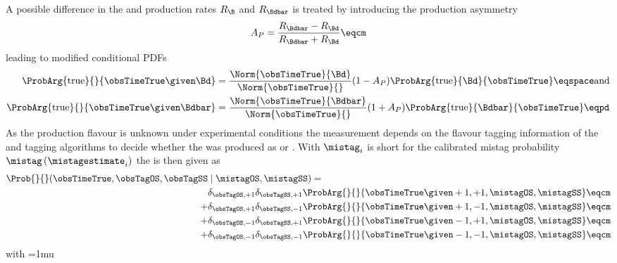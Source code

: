 %
A possible difference in the \Bd and \Bdbar production rates $R_{\B}$ and
$R_{\Bdbar}$ is treated by introducing the production asymmetry
%
\begin{equation}\label{eq:measurement_of_sin2beta:likelihood_fit:model:decay_time:production_asymmetry}
  A_P = \frac{R_{\Bdbar} - R_{\Bd}}{R_{\Bdbar} + R_{\Bd}}\eqcm
\end{equation}
%
leading to modified conditional \acp{PDF}
%
\begin{equation}\label{eq:measurement_of_sin2beta:likelihood_fit:model:decay_time:true_pdf}
  \begin{split}
    \ProbArg{\text{true}}{}{\obsTimeTrue\given\Bd}    &= \frac{\Norm{\obsTimeTrue}{\Bd}}{\Norm{\obsTimeTrue}{}}    (1 - A_P) \ProbArg{\text{true}}{\Bd}{\obsTimeTrue}     \eqspace \text{and} \\
    \ProbArg{\text{true}}{}{\obsTimeTrue\given\Bdbar} &= \frac{\Norm{\obsTimeTrue}{\Bdbar}}{\Norm{\obsTimeTrue}{}} (1 + A_P) \ProbArg{\text{true}}{\Bdbar}{\obsTimeTrue}  \eqpd
  \end{split}
\end{equation}
%
As the production flavour is unknown under experimental conditions the
measurement depends on the flavour tagging information of the \OS and \SSpi
tagging algorithms to decide whether the \Bmeson was produced as \Bd or \Bdbar.
With $\mistag_{i}$ is short for the calibrated mistag probability
$\mistag\left(\mistagestimate_{i}\right)$ the \PDF is then given as
%
\begin{equation}\label{eq:measurement_of_sin2beta:likelihood_fit:model:decay_time:measured_pdf_tagged_only}
\begin{split}
  \Prob{}{}(\obsTimeTrue, \obsTagOS, \obsTagSS &\mid \mistagOS, \mistagSS) = \\
        &\delta_{\obsTagOS,+1}\delta_{\obsTagSS,+1} \ProbArg{}{}{\obsTimeTrue \given +1, +1, \mistagOS, \mistagSS} \eqcm \\
      + &\delta_{\obsTagOS,+1}\delta_{\obsTagSS,-1} \ProbArg{}{}{\obsTimeTrue \given +1, -1, \mistagOS, \mistagSS} \eqcm \\
      + &\delta_{\obsTagOS,-1}\delta_{\obsTagSS,+1} \ProbArg{}{}{\obsTimeTrue \given -1, +1, \mistagOS, \mistagSS} \eqcm \\
      + &\delta_{\obsTagOS,-1}\delta_{\obsTagSS,-1} \ProbArg{}{}{\obsTimeTrue \given -1, -1, \mistagOS, \mistagSS} \eqcm 
  \end{split}
\end{equation}
%
with
%
\begingroup
  \thinmuskip=1mu
